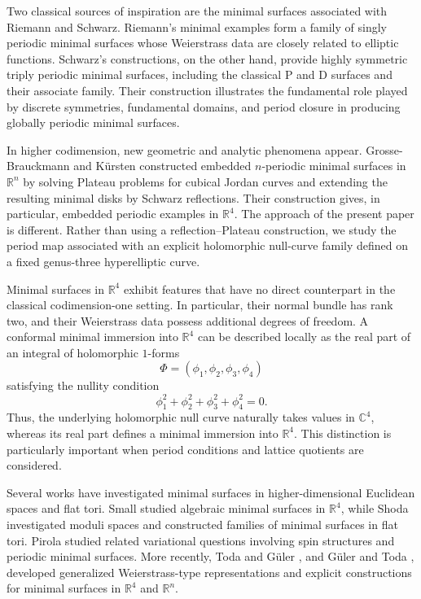 \documentclass[12pt]{article}
\numberwithin{equation}{section}
\theoremstyle{definition}
\theoremstyle{remark}
\begin{document}
Two classical sources of inspiration are the minimal surfaces associated
with Riemann and Schwarz. Riemann's minimal examples form a family of
singly periodic minimal surfaces whose Weierstrass data are closely
related to elliptic functions. Schwarz's constructions, on the other
hand, provide highly symmetric triply periodic minimal surfaces,
including the classical P and D surfaces and their associate family.
Their construction illustrates the fundamental role played by discrete
symmetries, fundamental domains, and period closure in producing
globally periodic minimal surfaces.

In higher codimension, new geometric and analytic phenomena appear.
Grosse-Brauckmann and Kürsten \cite{GrosseBrauckmannKuersten}
constructed embedded $n$-periodic minimal surfaces in $\mathbb{R}^n$
by solving Plateau problems for cubical Jordan curves and extending
the resulting minimal disks by Schwarz reflections. Their construction
gives, in particular, embedded periodic examples in $\mathbb{R}^4$.
The approach of the present paper is different. Rather than using a
reflection--Plateau construction, we study the period map associated
with an explicit holomorphic null-curve family defined on a fixed
genus-three hyperelliptic curve.

Minimal surfaces in $\mathbb{R}^4$ exhibit features that have no direct
counterpart in the classical codimension-one setting. In particular,
their normal bundle has rank two, and their Weierstrass data possess
additional degrees of freedom. A conformal minimal immersion into
$\mathbb{R}^4$ can be described locally as the real part of an integral
of holomorphic $1$-forms
\[
\Phi=(\phi_1,\phi_2,\phi_3,\phi_4)
\]
satisfying the nullity condition
\[
\phi_1^2+\phi_2^2+\phi_3^2+\phi_4^2=0.
\]
Thus, the underlying holomorphic null curve naturally takes values in
$\mathbb{C}^4$, whereas its real part defines a minimal immersion into
$\mathbb{R}^4$. This distinction is particularly important when period
conditions and lattice quotients are considered.

Several works have investigated minimal surfaces in higher-dimensional
Euclidean spaces and flat tori. Small \cite{SmallR4} studied algebraic
minimal surfaces in $\mathbb{R}^4$, while Shoda
\cite{ShodaJLMS,ShodaTrigonal,ShodaModuliArXiv} investigated moduli
spaces and constructed families of minimal surfaces in flat tori.
Pirola \cite{PirolaSpin} studied related variational questions involving
spin structures and periodic minimal surfaces. More recently, Toda and
G\"uler \cite{TodaGulerR4}, and G\"uler and Toda \cite{TodaGulerRn},
developed generalized Weierstrass-type representations and explicit
constructions for minimal surfaces in $\mathbb{R}^4$ and
$\mathbb{R}^n$.
\end{document}
